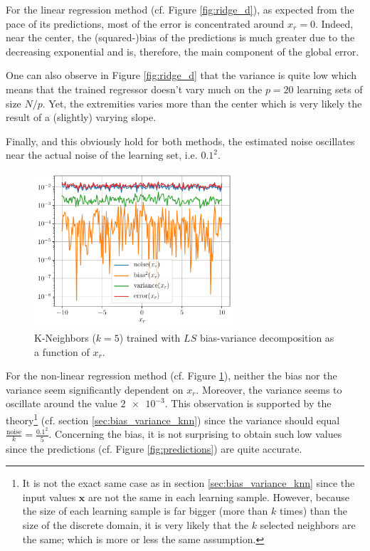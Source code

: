 \documentclass[a4paper, 12pt]{article}
\begin{document}
\begin{enumerate}[label=(\alph*)]
        For the linear regression method (cf. Figure \ref{fig:ridge_d}), as expected from the pace of its predictions, most of the error is concentrated around $x_r = 0$. Indeed, near the center, the (squared-)bias of the predictions is much greater due to the decreasing exponential and is, therefore, the main component of the global error.
         
        One can also observe in Figure \ref{fig:ridge_d} that the variance is quite low which means that the trained regressor doesn't vary much on the $p = 20$ learning sets of size $N / p$. Yet, the extremities varies more than the center which is very likely the result of a (slightly) varying slope.
        
        Finally, and this obviously hold for both methods, the estimated noise oscillates near the actual noise of the learning set, i.e. $0.1^2$.
        
        \begin{figure}[h]
            \centering
            \includegraphics[width=0.66\textwidth]{resources/pdf/knr.pdf}
            \vspace{-1em}
            \caption{K-Neighbors ($k = 5$) trained with $LS$ bias-variance decomposition as a function of $x_r$.}
            \label{fig:k-nearest_d}
        \end{figure}
        
        For the non-linear regression method (cf. Figure \ref{fig:k-nearest_d}), neither the bias nor the variance seem significantly dependent on $x_r$. Moreover, the variance seems to oscillate around the value $\num{2e-3}$. This observation is supported by the theory\footnote{It is not the exact same case as in section \ref{sec:bias_variance_knn} since the input values $\bm{x}$ are not the same in each learning sample. However, because the size of each learning sample is far bigger (more than $k$ times) than the size of the discrete domain, it is very likely that the $k$ selected neighbors are the same; which is more or less the same assumption.} (cf. section \ref{sec:bias_variance_knn}) since the variance should equal $\frac{\text{noise}}{k} = \frac{0.1^2}{5}$. Concerning the bias, it is not surprising to obtain such low values since the predictions (cf. Figure \ref{fig:predictions}) are quite accurate.
        

\end{enumerate}
\end{document}
